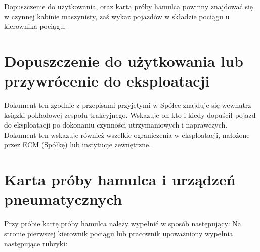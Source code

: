 Dopuszczenie do użytkowania, oraz karta próby hamulca powinny znajdować się w czynnej kabinie maszynisty, zaś wykaz pojazdów w składzie pociągu u kierownika pociągu.

\section{Dopuszczenie do użytkowania lub przywrócenie do eksploatacji}
Dokument ten zgodnie z przepisami przyjętymi w Spółce znajduje się wewnątrz ksiązki pokładowej zespołu trakcyjnego. Wskazuje on kto i kiedy dopuścił pojazd do eksploatacji po dokonaniu czynności utrzymaniowych i naprawczych. Dokument ten wskazuje również wszelkie ograniczenia w eksploatacji, nałożone przez ECM (Spółkę) lub instytucje zewnętrzne.

\section{Karta próby hamulca i urządzeń pneumatycznych}
Przy próbie kartę próby hamulca należy wypełnić w sposób następujący:
Na stronie pierwszej kierownik pociągu lub pracownik upoważniony wypełnia następujące rubryki:
